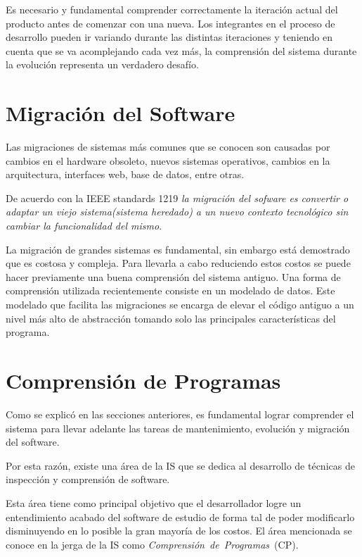 \documentclass[a4paper,12pt]{report}
\begin{document}
Es necesario y fundamental comprender correctamente la iteración actual del producto antes de comenzar con una nueva. Los integrantes en el proceso de desarrollo pueden ir variando durante las distintas iteraciones y teniendo en cuenta que se va acomplejando cada vez más, la comprensión del sistema durante la evolución representa un verdadero desafío.


\section{Migración del Software}

Las migraciones de sistemas más comunes que se conocen son causadas por cambios en el hardware obsoleto, nuevos sistemas operativos, cambios en la arquitectura, interfaces web, base de datos, entre otras\cite{MMFAF07}. 
 
De acuerdo con la IEEE standards 1219 \textit{la migración del sofware es convertir o adaptar un viejo sistema(sistema heredado) a un nuevo contexto tecnológico sin cambiar la funcionalidad del mismo}.
 
La migración de grandes sistemas es fundamental, sin embargo está demostrado que es costosa y compleja\cite{MMFAF07}. Para llevarla a cabo reduciendo estos costos se puede hacer previamente una buena comprensión del sistema antiguo. Una forma de comprensión utilizada recientemente consiste en un mode\-lado de datos\cite{WHAFVR11}. Este modelado que facilita las migraciones se encarga de elevar el código antiguo a un nivel más alto de abstracción tomando solo las principales características del programa.

\section{Comprensión de Programas}

Como se explicó en las secciones anteriores, es fundamental lograr comprender el sistema para llevar adelante las tareas de mantenimiento, evolución y migración del software.
	
Por esta razón, existe una área de la IS que se dedica al desarrollo de técnicas de inspección y comprensión de software. 

Esta área tiene como principal objetivo que el desarrollador logre un entendimiento acabado del software de estudio de forma tal de poder mo\-dificarlo disminuyendo en lo posible la gran mayoría de los costos. El área mencionada se conoce en la jerga de la IS como \mbox{\textit{Comprensión de Programas} (CP).}
\end{document}
